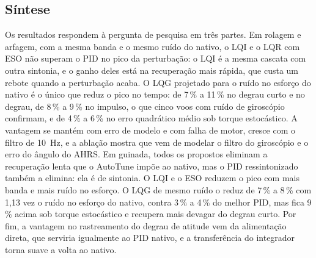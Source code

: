 \begin{table}[htbp]
\centering
\caption{Volta ao nativo sob torque sustentado, sem e com a transferência do
integrador.}
\label{tab:res-comutacao}
\small


\nota{\raggedright }
\end{table}

\subsection{Síntese}

Os resultados respondem à pergunta de pesquisa em três partes. Em rolagem e
arfagem, com a mesma banda e o mesmo ruído do nativo, o LQI e o LQR com ESO
não superam o PID no pico da perturbação: o LQI é a mesma cascata com outra
sintonia, e o ganho deles está na recuperação mais rápida, que custa um
rebote quando a perturbação acaba. O LQG projetado para o ruído no esforço
do nativo é o único que reduz o pico no tempo: de 7\,\% a 11\,\% no degrau
curto e no degrau, de 8\,\% a 9\,\% no impulso, o que cinco voos com ruído
de giroscópio confirmam, e de 4\,\% a 6\,\% no erro quadrático médio sob
torque estocástico. A vantagem se mantém com erro de modelo e com falha de
motor, cresce com o filtro de \SI{10}{\hertz}, e a ablação mostra que vem de
modelar o filtro do giroscópio e o erro do ângulo do AHRS. Em guinada, todos
os propostos eliminam a recuperação lenta que o AutoTune impõe ao nativo,
mas o PID ressintonizado também a elimina: ela é de sintonia. O LQI e o ESO
reduzem o pico com mais banda e mais ruído no esforço. O LQG de mesmo ruído
o reduz de 7\,\% a 8\,\% com 1,13 vez o ruído no esforço do nativo, contra
3\,\% a 4\,\% do melhor PID, mas fica 9\,\% acima sob torque estocástico e
recupera mais devagar do degrau curto. Por fim, a vantagem no rastreamento
do degrau de atitude vem da alimentação direta, que serviria igualmente ao
PID nativo, e a transferência do integrador torna suave a volta ao nativo.

